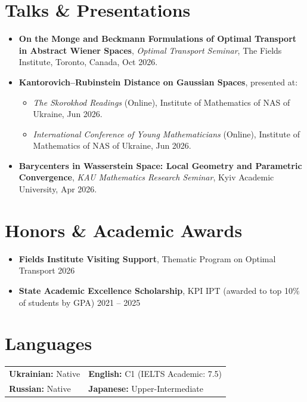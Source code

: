 \documentclass[10pt, a4paper]{article}
\begin{document}
\section{Talks \& Presentations}

\begin{itemize}
    \item \textbf{On the Monge and Beckmann Formulations of Optimal Transport in Abstract Wiener Spaces},
        \textit{Optimal Transport Seminar}, The Fields Institute, Toronto, Canada, Oct 2026.
    \item \textbf{Kantorovich--Rubinstein Distance on Gaussian Spaces}, presented at:
      \begin{itemize}[leftmargin=1.5em]
        \item \textit{The Skorokhod Readings} (Online),
            Institute of Mathematics of NAS of Ukraine, Jun 2026.
        \item \textit{International Conference of Young Mathematicians} (Online),
            Institute of Mathematics of NAS of Ukraine, Jun 2026.
      \end{itemize}
    \item \textbf{Barycenters in Wasserstein Space: Local Geometry and Parametric Convergence},
        \textit{KAU Mathematics Research Seminar}, Kyiv Academic University, Apr 2026.
\end{itemize}

\section{Honors \& Academic Awards}

\begin{itemize}
    \item \textbf{Fields Institute Visiting Support}, Thematic Program on Optimal Transport \hfill 2026
    \item \textbf{State Academic Excellence Scholarship}, KPI IPT (awarded to top 10\% of students by GPA) \hfill 2021 -- 2025
\end{itemize}

\section{Languages}

\noindent
\begin{tabular}{@{}p{}p{}@{}}
    \textbf{Ukrainian:} Native & \textbf{English:} C1 (IELTS Academic: 7.5) \\
    \textbf{Russian:} Native & \textbf{Japanese:} Upper-Intermediate
\end{tabular}
\end{document}

